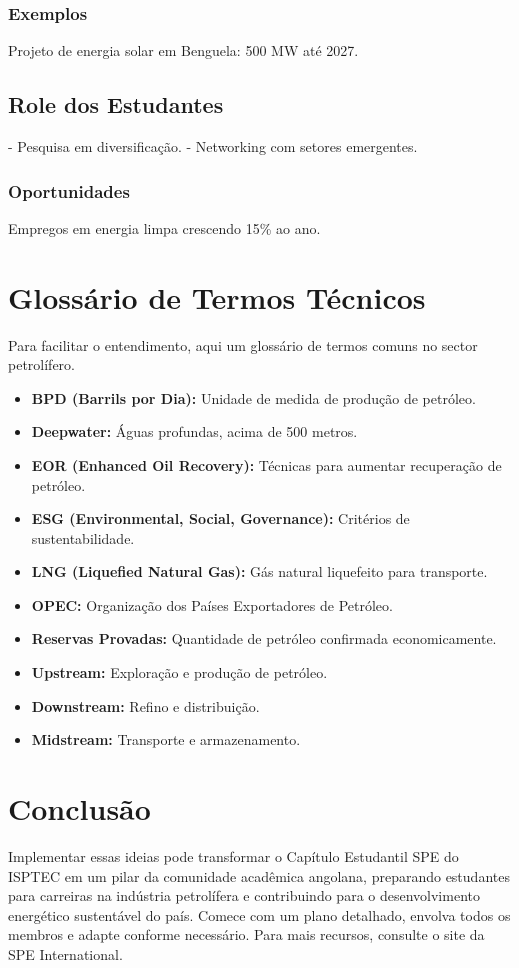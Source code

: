 \documentclass[12pt]{article}
\begin{document}
\subsubsection{Exemplos}
Projeto de energia solar em Benguela: 500 MW até 2027.

\subsection{Role dos Estudantes}
- Pesquisa em diversificação.
- Networking com setores emergentes.

\subsubsection{Oportunidades}
Empregos em energia limpa crescendo 15\% ao ano.

\section{Glossário de Termos Técnicos}

Para facilitar o entendimento, aqui um glossário de termos comuns no sector petrolífero.

\begin{itemize}
    \item \textbf{BPD (Barrils por Dia):} Unidade de medida de produção de petróleo.
    \item \textbf{Deepwater:} Águas profundas, acima de 500 metros.
    \item \textbf{EOR (Enhanced Oil Recovery):} Técnicas para aumentar recuperação de petróleo.
    \item \textbf{ESG (Environmental, Social, Governance):} Critérios de sustentabilidade.
    \item \textbf{LNG (Liquefied Natural Gas):} Gás natural liquefeito para transporte.
    \item \textbf{OPEC:} Organização dos Países Exportadores de Petróleo.
    \item \textbf{Reservas Provadas:} Quantidade de petróleo confirmada economicamente.
    \item \textbf{Upstream:} Exploração e produção de petróleo.
    \item \textbf{Downstream:} Refino e distribuição.
    \item \textbf{Midstream:} Transporte e armazenamento.
\end{itemize}

\section{Conclusão}

Implementar essas ideias pode transformar o Capítulo Estudantil SPE do ISPTEC em um pilar da comunidade acadêmica angolana, preparando estudantes para carreiras na indústria petrolífera e contribuindo para o desenvolvimento energético sustentável do país. Comece com um plano detalhado, envolva todos os membros e adapte conforme necessário. Para mais recursos, consulte o site da SPE International.
\end{document}
